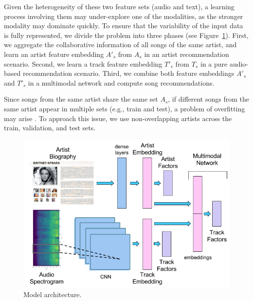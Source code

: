Given the heterogeneity of these two feature sets (audio and text), a learning process involving them may under-explore one of the modalities, as the stronger modality may dominate quickly. 
To ensure that the variability of the input data is fully represented, we divide the problem into three phases (see Figure~\ref{fig:approach}). First, we aggregate the collaborative information of all songs of the same artist, and learn an artist feature embedding $A'_{s}$ from $A_{s}$ in an artist recommendation scenario. Second, we learn a track feature embedding $T'_{s}$ from $T_{s}$ in a pure audio-based recommendation scenario. Third, we combine both feature embeddings $A'_{s}$ and $T'_{s}$ in a multimodal network and compute song recommendations. 

Since songs from the same artist share the same set $A_{s}$, if different songs from the same artist appear in multiple sets (e.g., train and test), a problem of overfitting may arise \cite{Flexer2007ACL}.
To approach this issue, we use non-overlapping artists across the train, validation, and test sets.



\begin{figure}[!htp]
\centerline{
\includegraphics[width=0.75\columnwidth]{ch08_cold-rec_pics/approach.png}}
\caption{Model architecture.}
\label{fig:approach}
\end{figure}

